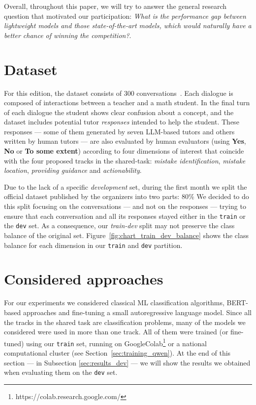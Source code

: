 \documentclass[11pt]{article}
\begin{document}
Overall, throughout this paper, we will try to answer the general research question that motivated our participation:
\textit{What is the performance gap between lightweight models and those state-of-the-art models, which would naturally have a better chance of winning the competition?}.






\section{Dataset}
\label{sec:dataset}


For this edition, the dataset consists of 300 conversations~\cite{maurya-etal-2025-unifying}.
Each dialogue is composed of interactions between a teacher and a math student.
In the final turn of each dialogue the student shows clear confusion about a concept, and the dataset includes potential tutor \textit{responses} intended to help the student.
These responses --- some of them generated by seven LLM-based tutors and others written by human tutors ---  are also evaluated by human evaluators (using \textbf{Yes}, \textbf{No} or \textbf{To some extent}) according to four dimensions of interest that coincide with the four proposed tracks in the shared-task: \textit{mistake identification}, \textit{mistake location}, \textit{providing guidance} and \textit{actionability}.

Due to the lack of a specific \textit{development} set, during the first month we split the official dataset published by the organizers into two parts: 80\%
We decided to do this split focusing on the conversations --- and not on the responses --- trying to ensure that each conversation and all its responses stayed either in the \texttt{train} or the \texttt{dev} set. 
As a consequence, our \textit{train-dev} split may not preserve the class balance of the original set.
Figure~\ref{fig:chart_train_dev_balance} shows the class balance for each dimension in our \texttt{train} and \texttt{dev} partition. 




\section{Considered approaches}
\label{sec:approaches}

For our experiments we considered classical ML classification algorithms, BERT-based approaches and fine-tuning a small autoregressive language model.
Since all the tracks in the shared task are classification problems, many of the models we considered were used in more than one track.
All of them were trained (or fine-tuned) using our \texttt{train} set, running on GoogleColab\footnote{https://colab.research.google.com/} or a national computational cluster (see Section~\ref{sec:training_qwen}). 
At the end of this section --- in Subsection \ref{sec:results_dev} --- we will show the results we obtained when evaluating them on the \texttt{dev} set.
\end{document}
